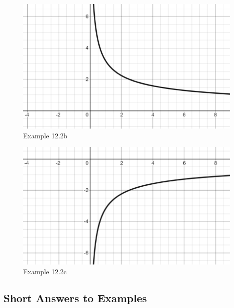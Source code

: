     \begin{figure}[h!]
 \centering
    \includegraphics[scale=0.45]{images/implicitDiff/implicit12_2b.PNG}
    \caption{Example 12.2b}
    \end{figure}
      \begin{figure}[h!]
 \centering
    \includegraphics[scale=0.45]{images/implicitDiff/implicit12_2c.PNG}
    \caption{Example 12.2c}
    \end{figure}







\vspace*{\fill}

\subsection*{Short Answers to Examples}




